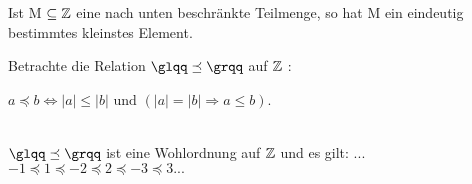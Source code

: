 \begin{bem}
Ist M $ \subseteq \mathbb{Z}$ eine nach unten beschränkte Teilmenge, so hat M ein eindeutig bestimmtes kleinstes Element. \cite{rainer08}
\end{bem} 

%
%
%
\begin{bsp}
Betrachte die Relation $\glqq \preceq \grqq $ auf $ \mathbb{Z}$ :  \\
\centerline{$a \preceq b \Leftrightarrow |a| \leq |b| \text{ und } \left( |a| = |b| \Rightarrow a \leq  b \right)$.} \\
 $\glqq \preceq \grqq $ ist eine Wohlordnung auf $\mathbb{Z}$ und es gilt: ... $-1 \preceq 1 \preceq -2 \preceq 2 \preceq -3 \preceq 3 ... $ 
\end{bsp}


